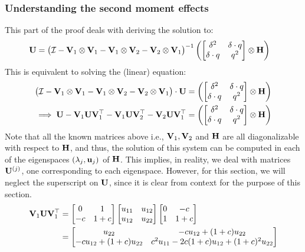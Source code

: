 \subsubsection{Understanding the second moment effects}\label{ssec:secMomentEffects}
This part of the proof deals with deriving the solution to:
\begin{align*}
\mathbf{U}&=\big(\mathcal{I}-\mathbf{V}_1\otimes\mathbf{V}_1 - \mathbf{V}_1\otimes\mathbf{V}_2 - \mathbf{V}_2\otimes\mathbf{V}_1\big)^{-1} \left(\begin{bmatrix}\delta^2&\delta\cdot q \\\delta\cdot q &q ^2\end{bmatrix}\otimes\mathbf{H}\right)
\end{align*}
This is equivalent to solving the (linear) equation:
\begin{align}
\label{eq:linEq}
\big(\mathcal{I}-\mathbf{V}_1\otimes\mathbf{V}_1 - \mathbf{V}_1\otimes\mathbf{V}_2 - \mathbf{V}_2\otimes\mathbf{V}_1\big)\cdot\mathbf{U}&= \left(\begin{bmatrix}\delta^2&\delta\cdot q \\\delta\cdot q &q ^2\end{bmatrix}\otimes\mathbf{H}\right) \nonumber\\
\implies\mathbf{U}-\mathbf{V}_1\mathbf{U}\mathbf{V}_1^{\top}-\mathbf{V}_1\mathbf{U}\mathbf{V}_2^{\top}-\mathbf{V}_2\mathbf{U}\mathbf{V}_1^{\top}&= \left(\begin{bmatrix}\delta^2&\delta\cdot q \\\delta\cdot q &q ^2\end{bmatrix}\otimes\mathbf{H}\right)
\end{align}
Note that all the known matrices above i.e., $\mathbf{V}_1, \mathbf{V}_2$ and $\mathbf{H}$ are all diagonalizable with respect to $\mathbf{H}$, and thus, the solution of this system can be computed in each of the eigenspaces $(\lambda_j,\mathbf{u}_j)$ of $\mathbf{H}$. This implies, in reality, we deal with matrices $\mathbf{U}^{(j)}$, one corresponding to each eigenspace. However, for this section, we will neglect the superscript on $\mathbf{U}$, since it is clear from context for the purpose of this section.
\begin{align*}
\mathbf{V}_1\mathbf{U}\mathbf{V}_1^{\top}&=\begin{bmatrix}0&1\\-c&1+c\end{bmatrix}\begin{bmatrix}u_{11}&u_{12}\\u_{12}&u_{22}\end{bmatrix}\begin{bmatrix}0&-c\\1&1+c\end{bmatrix}\\
&=\begin{bmatrix}u_{22}&-c u_{12}+(1+c)u_{22}\\-c u_{12}+(1+c)u_{22}&c^2u_{11}-2c(1+c)u_{12}+(1+c)^2u_{22}\end{bmatrix}
\end{align*}

